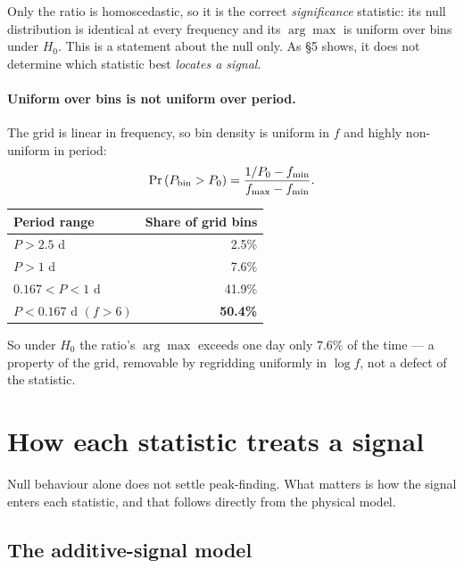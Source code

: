 \documentclass[11pt]{article}
\begin{document}
Only the ratio is homoscedastic, so it is the correct \emph{significance} statistic: its
null distribution is identical at every frequency and its $\arg\max$ is uniform over bins
under $H_0$. This is a statement about the null only. As \S5 shows, it does not determine
which statistic best \emph{locates a signal}.

\paragraph{Uniform over bins is not uniform over period.}
The grid is linear in frequency, so bin density is uniform in $f$ and highly non-uniform
in period:
%
\begin{equation}
  \Pr\left(P_{\rm bin} > P_0\right) = \frac{1/P_0 - f_{\min}}{f_{\max}-f_{\min}} .
  \label{eq:griddensity}
\end{equation}

\begin{table}[htbp]
\centering
\begin{tabular}{lr}
\toprule
Period range & Share of grid bins \\
\midrule
$P > 2.5$ d               & 2.5\% \\
$P > 1$ d                 & 7.6\% \\
$0.167 < P < 1$ d         & 41.9\% \\
$P < 0.167$ d $(f>6)$     & \textbf{50.4\%} \\
\bottomrule
\end{tabular}
\end{table}

So under $H_0$ the ratio's $\arg\max$ exceeds one day only $7.6\%$ of the time --- a
property of the grid, removable by regridding uniformly in $\log f$, not a defect of the
statistic.

\section{How each statistic treats a signal}

Null behaviour alone does not settle peak-finding. What matters is how the signal enters
each statistic, and that follows directly from the physical model.

\subsection{The additive-signal model}
\end{document}
